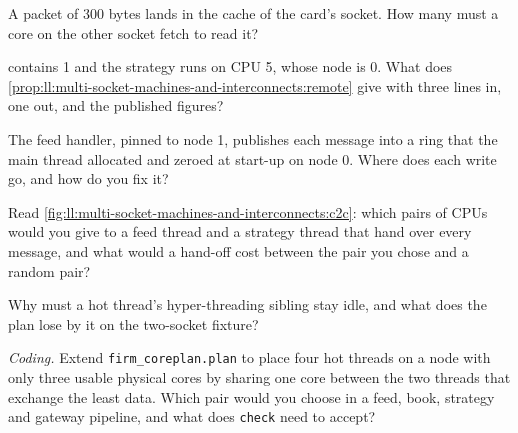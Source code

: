 \begin{exercise}[$\star$]\label{exo:ll:multi-socket-machines-and-interconnects:2}
A packet of 300 bytes lands in the cache of the card's socket. How many  must a core on the other socket fetch to
read it?
\end{exercise}

\begin{exercise}[$\star$]\label{exo:ll:multi-socket-machines-and-interconnects:3}
 contains 1 and the strategy runs on CPU 5, whose node is 0. What
does \cref{prop:ll:multi-socket-machines-and-interconnects:remote} give with three lines in, one out, and the published
figures?
\end{exercise}

\begin{exercise}[$\star\star$]\label{exo:ll:multi-socket-machines-and-interconnects:4}
The feed handler, pinned to node 1, publishes each message into a ring that the main thread allocated and zeroed at
start-up on node 0. Where does each write go, and how do you fix it?
\end{exercise}

\begin{exercise}[$\star\star$]\label{exo:ll:multi-socket-machines-and-interconnects:5}
Read \cref{fig:ll:multi-socket-machines-and-interconnects:c2c}: which pairs of CPUs would you give to a feed thread and a
strategy thread that hand over every message, and what would a hand-off cost between the pair you chose and a random pair?
\end{exercise}

\begin{exercise}[$\star\star$]\label{exo:ll:multi-socket-machines-and-interconnects:6}
Why must a hot thread's hyper-threading sibling stay idle, and what does the plan lose by it on the two-socket fixture?
\end{exercise}

\begin{exercise}[$\star\star\star$]\label{exo:ll:multi-socket-machines-and-interconnects:7}
\emph{Coding.} Extend \texttt{firm\_coreplan.plan} to place four hot threads on a node with only three usable physical cores
by sharing one core between the two threads that exchange the least data. Which pair would you choose in a feed, book,
strategy and gateway pipeline, and what does \texttt{check} need to accept?
\end{exercise}

